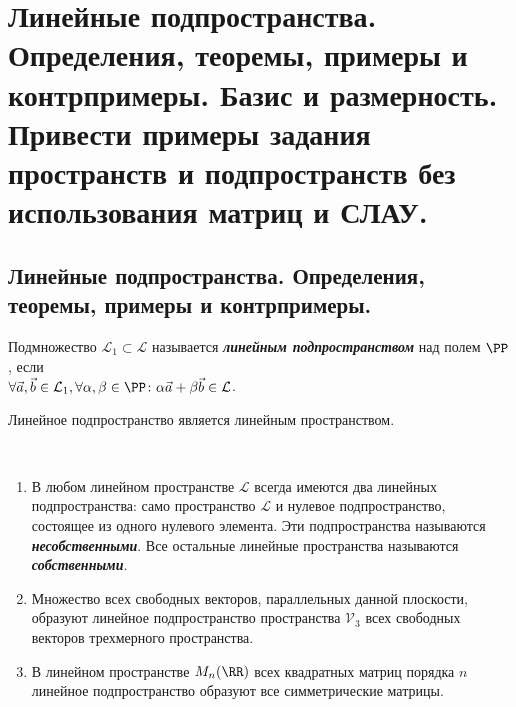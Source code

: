 \section{
    Линейные подпространства. Определения, теоремы, примеры и контрпримеры. Базис и размерность. Привести примеры задания пространств и подпространств без использования матриц и СЛАУ.
}

\subsection{
    Линейные подпространства. Определения, теоремы, примеры и контрпримеры.
}

\begin{definition}
    Подмножество $\mathcal{L}_1 \subset \mathcal{L}$ называется \textbf{\textit{линейным подпространством}} над полем $\PP$, если \\ $\forall \vec{a}, \vec{b} \in \mathcal{L}_1, \forall \alpha, \beta \in \PP \colon \alpha \vec{a} + \beta \vec{b} \in \mathcal{L}$.
\end{definition}

\begin{theorem}
    Линейное подпространство является линейным пространством.
\end{theorem}

\begin{example}~

    \begin{enumerate}
        \item В любом линейном пространстве $\mathcal{L}$ всегда имеются два линейных подпространства: само пространство $\mathcal{L}$ и нулевое подпространство, состоящее из одного нулевого элемента. Эти подпространства называются \textbf{\textit{несобственными}}. Все остальные линейные пространства называются \textbf{\textit{собственными}}.
        \item Множество всех свободных векторов, параллельных данной плоскости, образуют линейное подпространство пространства $\mathcal{V}_3$ всех свободных векторов трехмерного пространства.
        \item В линейном пространстве $M_n(\RR)$ всех квадратных матриц порядка $n$ линейное подпространство образуют все симметрические матрицы.
    \end{enumerate}
\end{example}

